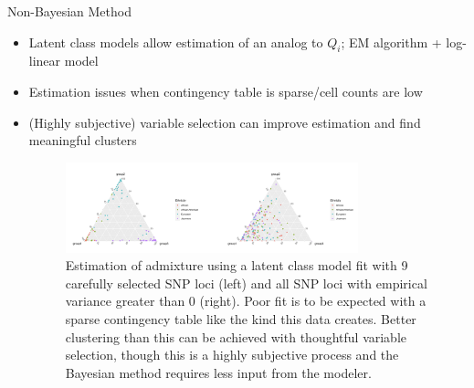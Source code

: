 \documentclass{beamer}
\begin{document}
\begin{frame}{Non-Bayesian Method}
\begin{itemize}
    \item Latent class models allow estimation of an analog to $Q_i$; EM algorithm + log-linear model
    \item Estimation issues when contingency table is sparse/cell counts are low
    \item (Highly subjective) variable selection can improve estimation and find meaningful clusters
    \begin{figure}
        \centering
        \includegraphics[width=0.8\textwidth]{SemesterProject/nonbayesian_method.png}
        \caption{\tiny{Estimation of admixture using a latent class model fit with 9 carefully selected SNP loci (left) and all SNP loci with empirical variance greater than 0 (right). Poor fit is to be expected with a sparse contingency table like the kind this data creates. Better clustering than this can be achieved with thoughtful variable selection, though this is a highly subjective process and the Bayesian method requires less input from the modeler.}}
        \label{fig:my_label}
    \end{figure}
    
\end{itemize}

\end{frame}

\begin{frame}
\end{frame}




\end{document}
